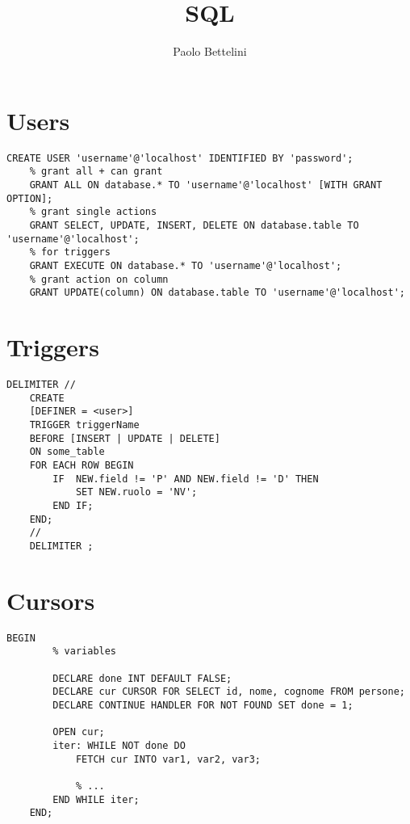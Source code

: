 \documentclass{article}
\title{SQL}
\author{Paolo Bettelini}
\date{}
\begin{document}
\maketitle
\tableofcontents
\pagebreak

\section{Users}

\begin{lstlisting}[style=sql]
    CREATE USER 'username'@'localhost' IDENTIFIED BY 'password';
    % grant all + can grant
    GRANT ALL ON database.* TO 'username'@'localhost' [WITH GRANT OPTION];
    % grant single actions
    GRANT SELECT, UPDATE, INSERT, DELETE ON database.table TO 'username'@'localhost';
    % for triggers
    GRANT EXECUTE ON database.* TO 'username'@'localhost';
    % grant action on column
    GRANT UPDATE(column) ON database.table TO 'username'@'localhost';
\end{lstlisting}

\section{Triggers}

\begin{lstlisting}[style=sql]
    DELIMITER //
    CREATE
    [DEFINER = <user>]
    TRIGGER triggerName
    BEFORE [INSERT | UPDATE | DELETE]
    ON some_table
    FOR EACH ROW BEGIN
        IF  NEW.field != 'P' AND NEW.field != 'D' THEN
            SET NEW.ruolo = 'NV';
        END IF;
    END;
    // 
    DELIMITER ;
\end{lstlisting}

\section{Cursors}

\begin{lstlisting}[style=sql]
    BEGIN
        % variables
        
        DECLARE done INT DEFAULT FALSE;
        DECLARE cur CURSOR FOR SELECT id, nome, cognome FROM persone;
        DECLARE CONTINUE HANDLER FOR NOT FOUND SET done = 1;

        OPEN cur;
        iter: WHILE NOT done DO
            FETCH cur INTO var1, var2, var3;

            % ...
        END WHILE iter;
    END;
\end{lstlisting}
\end{document}
